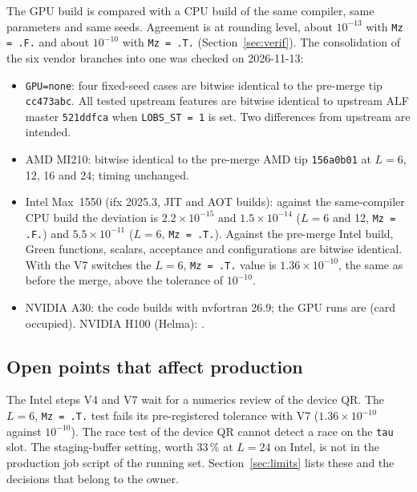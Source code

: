 The GPU build is compared with a CPU build of the same compiler, same parameters and same seeds. Agreement is at rounding level, about $10^{-13}$ with \texttt{Mz = .F.} and about $10^{-10}$ with \texttt{Mz = .T.} (Section~\ref{sec:verif}). The consolidation of the six vendor branches into one was checked on 2026-11-13:
\begin{itemize}
\item \texttt{GPU=none}: four fixed-seed cases are bitwise identical to the pre-merge tip \texttt{cc473abc}. All tested upstream features are bitwise identical to upstream ALF master \texttt{521ddfca} when \texttt{LOBS\_ST = 1} is set. Two differences from upstream are intended.
\item AMD MI210: bitwise identical to the pre-merge AMD tip \texttt{156a0b01} at $L=6$, 12, 16 and 24; timing unchanged.
\item Intel Max~1550 (ifx 2025.3, JIT and AOT builds): against the same-compiler CPU build the deviation is $2.2\times10^{-15}$ and $1.5\times10^{-14}$ ($L=6$ and 12, \texttt{Mz = .F.}) and $5.5\times10^{-11}$ ($L=6$, \texttt{Mz = .T.}). Against the pre-merge Intel build, Green functions, scalars, acceptance and configurations are bitwise identical. With the V7 switches the $L=6$, \texttt{Mz = .T.} value is $1.36\times10^{-10}$, the same as before the merge, above the tolerance of $10^{-10}$.
\item NVIDIA A30: the code builds with nvfortran 26.9; the GPU runs are  (card occupied). NVIDIA H100 (Helma): .
\end{itemize}

\subsection*{Open points that affect production}

The Intel steps V4 and V7 wait for a numerics review of the device QR. The $L=6$, \texttt{Mz = .T.} test fails its pre-registered tolerance with V7 ($1.36\times10^{-10}$ against $10^{-10}$). The race test of the device QR cannot detect a race on the \texttt{tau} slot. The staging-buffer setting, worth 33\,\% at $L=24$ on Intel, is not in the production job script of the running set. Section~\ref{sec:limits} lists these and the decisions that belong to the owner.
